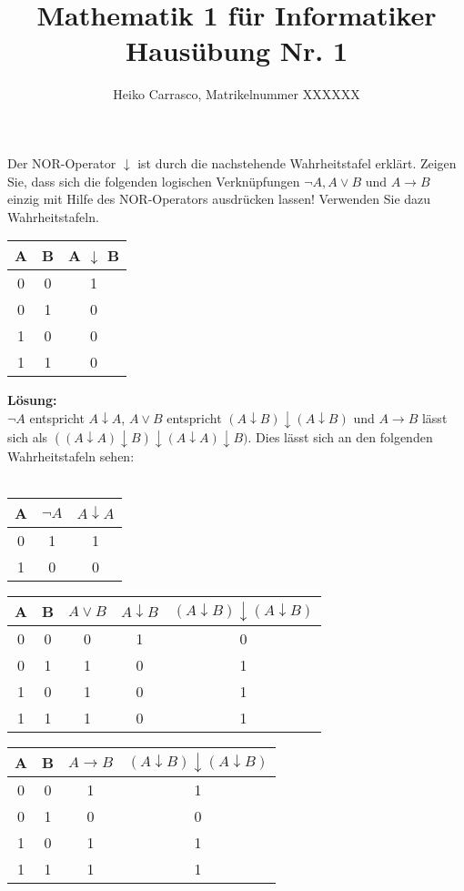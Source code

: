 \documentclass[accentcolor=2d]{tudaexercise}
\title{Mathematik 1 für Informatiker Hausübung Nr. 1}
\subtitle{Heiko Carrasco, Matrikelnummer XXXXXX}
\begin{document}
\maketitle
\begin{task}{}
Der NOR-Operator $\downarrow$ ist durch die nachstehende Wahrheitstafel erklärt. Zeigen Sie, dass sich die folgenden logischen Verknüpfungen $\lnot A, A \lor B \text{ und } A\rightarrow B$ einzig mit Hilfe des NOR-Operators ausdrücken lassen! Verwenden Sie dazu Wahrheitstafeln.
\begin{center}

\begin{tabular}{c|c|c}
	A & B & A $\downarrow$ B \\ \hline
	0&0&1 \\
	0&1&0 \\
	1&0&0 \\
	1&1&0 \\
	
\end{tabular}
\end{center}
\textbf{Lösung:}\\
$\lnot A$ entspricht $A\downarrow A$, $A \lor B$ entspricht $(A\downarrow B)\downarrow(A\downarrow B)$ und $A\rightarrow B$ lässt sich als $((A\downarrow A)\downarrow B)\downarrow(A\downarrow A)\downarrow B)$. Dies lässt sich an den folgenden Wahrheitstafeln sehen:\\\\
\begin{tabular}{c|c|c}
	A & $\lnot A$ & $A\downarrow A$ \\\hline
	0 & 1 & 1\\
	1 & 0 & 0\\
\end{tabular}
\hspace{1cm}
\begin{tabular}{c|c|c|c|c}
	A & B & $A \lor B$ & $A \downarrow B$ &  $(A\downarrow B)\downarrow(A\downarrow B)$ \\\hline
	0 & 0 & 0 & 1 & 0\\
	0 & 1 & 1 & 0 & 1\\
	1 & 0 & 1 & 0 & 1\\
	1 & 1 & 1 & 0 & 1\\
\end{tabular}
\hspace{1cm}
\begin{tabular}{c|c|c|c}
	A & B & $A \to B$ & $(A\downarrow B)\downarrow(A\downarrow B)$ \\\hline
		0 & 0 & 1 & 1 \\
		0 & 1 & 0 & 0 \\
		1 & 0 & 1 & 1 \\
		1 & 1 & 1 & 1 \\
\end{tabular}
\end{task}
\end{document}
